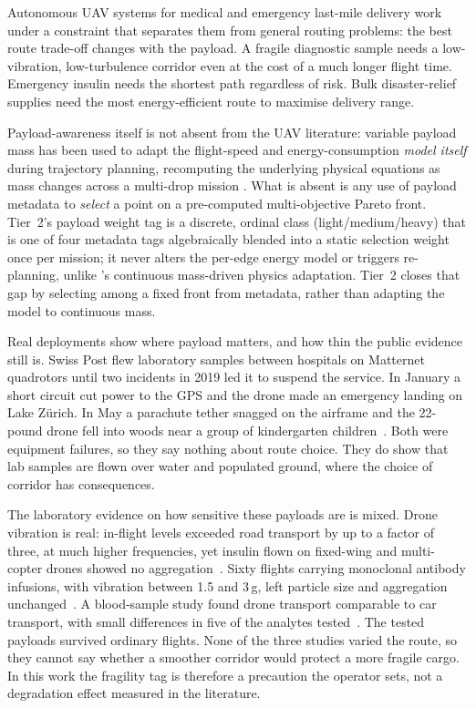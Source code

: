 \documentclass{ssnreview}
\begin{document}
Autonomous UAV systems for medical and emergency last-mile delivery work under a
constraint that separates them from general routing problems: the best route trade-off
changes with the payload. A fragile diagnostic sample needs a low-vibration,
low-turbulence corridor even at the cost of a much longer flight time. Emergency insulin
needs the shortest path regardless of risk. Bulk disaster-relief supplies need the most
energy-efficient route to maximise delivery range.

Payload-awareness itself is not absent from the UAV literature: variable payload mass has
been used to adapt the flight-speed and energy-consumption \emph{model itself} during
trajectory planning, recomputing the underlying physical equations as mass changes across
a multi-drop mission \cite{r10}. What is absent is any use of payload metadata to
\emph{select} a point on a pre-computed multi-objective Pareto front. Tier~2's payload
weight tag is a discrete, ordinal class (light/medium/heavy) that is one of four metadata
tags algebraically blended into a static selection weight once per mission; it never
alters the per-edge energy model or triggers re-planning, unlike \cite{r10}'s continuous
mass-driven physics adaptation. Tier~2 closes that gap by selecting among a fixed front
from metadata, rather than adapting the model to continuous mass.

Real deployments show where payload matters, and how thin the public evidence still is.
Swiss Post flew laboratory samples between hospitals on Matternet quadrotors until two
incidents in 2019 led it to suspend the service. In January a short circuit cut power to
the GPS and the drone made an emergency landing on Lake Z\"{u}rich. In May a parachute
tether snagged on the airframe and the 22-pound drone fell into woods near a group of
kindergarten children~\cite{r12}. Both were equipment failures, so they say nothing
about route choice. They do show that lab samples are flown over water and populated
ground, where the choice of corridor has consequences.

The laboratory evidence on how sensitive these payloads are is mixed. Drone vibration is
real: in-flight levels exceeded road transport by up to a factor of three, at much higher
frequencies, yet insulin flown on fixed-wing and multi-copter drones showed no
aggregation~\cite{r13}. Sixty flights carrying monoclonal antibody infusions, with
vibration between 1.5 and 3\,g, left particle size and aggregation unchanged~\cite{r14}.
A blood-sample study found drone transport comparable to car transport, with small
differences in five of the analytes tested~\cite{r15}. The tested payloads survived
ordinary flights. None of the three studies varied the route, so they cannot say whether
a smoother corridor would protect a more fragile cargo. In this work the fragility tag is
therefore a precaution the operator sets, not a degradation effect measured in the
literature.
\end{document}
